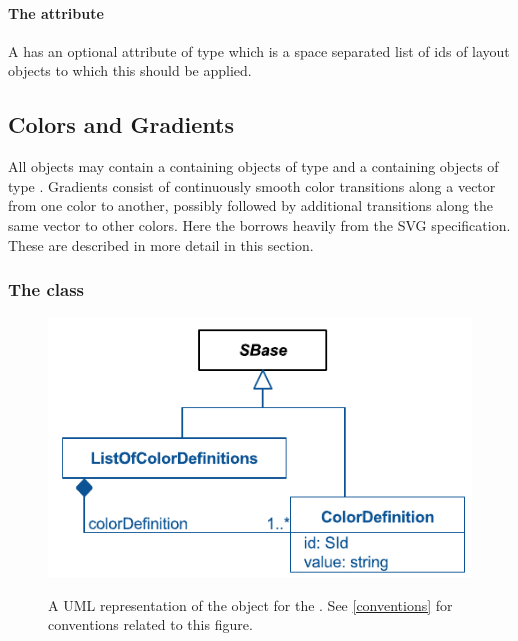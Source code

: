 \paragraph{The \fixttspace{} attribute}

A \LocalStyle has an optional attribute  of type
 which is a space separated list of ids of layout objects to 
which this \Style should be applied.


\subsection{Colors and Gradients}

All \RenderInformation objects may contain a \ListOfColorDefinitions containing 
objects of type \ColorDefinition and a \ListOfGradientDefinitions containing 
objects of type \GradientBase. Gradients consist of continuously smooth color 
transitions along a vector from one color to another, possibly followed by 
additional transitions along the same vector to other colors. Here the \RenderPackage 
borrows heavily from the SVG specification. These are described in more detail in this section. 
 
\subsubsection{The  class}
\label{colordefinition-class}

\begin{figure}[h!]
  \centering
  \includegraphics[width=\textwidth]{images/render-color-definition-uml}\\
  \caption{A UML representation of the \ColorDefinition object for the \RenderPackage.  See \ref{conventions} for conventions related to this figure. }
  \label{fig:color_render_uml}
\end{figure}



